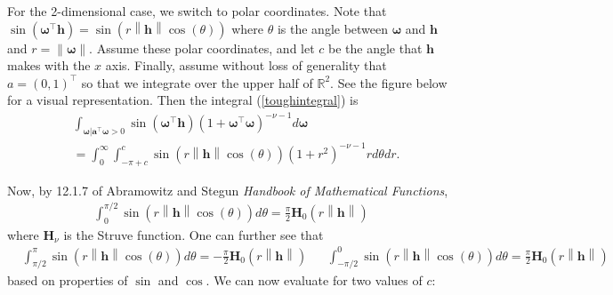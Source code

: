 \documentclass[11pt]{article}
\newcommand{\vint}{\boldsymbol{\omega}}
\newcommand{\vpla}{\boldsymbol{a}}
\begin{document}
 
 For the 2-dimensional case, we switch to polar coordinates. Note that $\sin(\vint^\top \boldsymbol{h}) = \sin(r \left\lVert \boldsymbol{h}\right\rVert \cos(\theta))$ where $\theta$ is the angle between $\vint$ and $\boldsymbol{h}$ and $r = \left\lVert \vint \right\rVert$. Assume these polar coordinates, and let $c$ be the angle that $\boldsymbol{h}$ makes with the $x$ axis. Finally, assume without loss of generality that $a = (0,1)^\top$ so that we integrate over the upper half of $\mathbb{R}^2$. See the figure below for a visual representation. Then the integral (\ref{toughintegral}) is \begin{align*}
&\int_{\vint | \vpla^\top \vint > 0}\sin(\vint^\top \boldsymbol{h})(1 + \vint^\top \vint)^{-\nu- 1} d\vint \\
&= \int_0^\infty  \int_{-\pi + c}^{c} \sin(r\left\lVert \boldsymbol{h}\right\rVert \cos(\theta)) (1 +r^2)^{- \nu - 1} r d\theta dr. %
 \end{align*}

 
Now, by 12.1.7 of Abramowitz and Stegun \textit{Handbook of Mathematical Functions}, 
\begin{align*}
 \int_0^{\pi/2}  \sin(r\left\lVert \boldsymbol{h}\right\rVert \cos(\theta)) d\theta= \frac{\pi}{2} \boldsymbol{H}_{0}(r\left\lVert \boldsymbol{h}\right\rVert) \end{align*}where $\boldsymbol{H}_\nu$ is the Struve function. One can further see that \begin{align*}
  &\int_{\pi/2}^\pi  \sin(r\left\lVert \boldsymbol{h}\right\rVert \cos(\theta)) d\theta= -\frac{\pi}{2} \boldsymbol{H}_{0}(r\left\lVert \boldsymbol{h}\right\rVert) &   &\int_{-\pi/2}^0  \sin(r\left\lVert \boldsymbol{h}\right\rVert \cos(\theta)) d\theta= \frac{\pi}{2} \boldsymbol{H}_{0}(r\left\lVert \boldsymbol{h}\right\rVert)
 \end{align*}based on properties of $\sin$ and $\cos$. We can now evaluate for two values of $c$:
 
\end{document}
